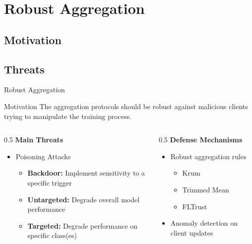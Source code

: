 \documentclass[t,aspectratio=169]{beamer}
\begin{document}
\section{Robust Aggregation}
\subsection{Motivation}
\subsection{Threats}
\begin{frame}{Robust Aggregation}
    
\begin{alertblock}{Motivation}
    The aggregation protocols should be robust against malicious clients trying to manipulate the training process.
\end{alertblock}
\begin{columns}
\begin{column}{0.5\textwidth}
\textbf{Main Threats}
\begin{itemize}
    \item Poisoning Attacks
    \begin{itemize}
        \item \textbf{Backdoor:} Implement sensitivity to a specific trigger
        \item \textbf{Untargeted:} Degrade overall model performance
        \item \textbf{Targeted:} Degrade performance on specific class(es)
    \end{itemize}
\end{itemize} 
\end{column}
\begin{column}{0.5\textwidth}
    \textbf{Defense Mechanisms}
    \begin{itemize}
        \item Robust aggregation rules
        \begin{itemize}
            \item Krum
            \item Trimmed Mean
            \item FLTrust
        \end{itemize}
        \item Anomaly detection on client updates
    \end{itemize}
\end{column}
\end{columns}
\end{frame}
\end{document}
